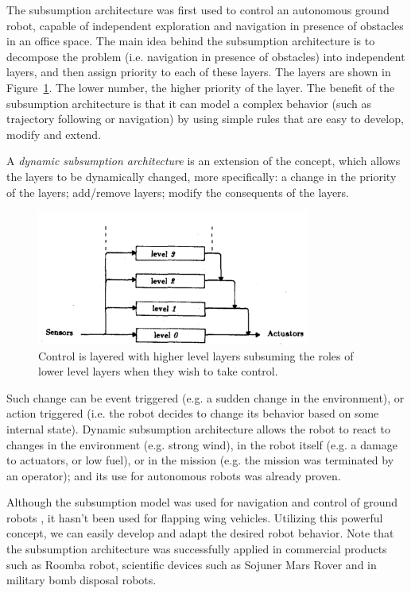 The subsumption architecture was first used to control an autonomous ground robot, capable of independent exploration and navigation in presence of obstacles in an office space. The main idea behind the subsumption architecture is to decompose the problem (i.e. navigation in presence of obstacles) into independent layers, and then assign priority to each of these layers. The layers are shown in Figure~\ref{fig_subsump}. The lower number, the higher priority of the layer. The benefit of the subsumption architecture is that it can model a complex behavior (such as trajectory following or navigation) by using simple rules that are easy to develop, modify and extend.

A \textit{dynamic subsumption architecture} is an extension of the concept, which allows the layers to be dynamically changed, more specifically: a change in the priority of the layers; add/remove layers; modify the consequents of the layers.

\begin{figure}
\centering
\includegraphics[width=0.8\textwidth]{Files/Figures/subsumption.png}
\caption[Subsumption architecture control layers]{Control is layered with higher level layers subsuming the roles of lower level layers when they wish to take control. \cite{brooks}}
\label{fig_subsump}
\end{figure}

Such change can be event triggered (e.g. a sudden change in the environment), or action triggered (i.e. the robot decides to change its behavior based on some internal state). Dynamic subsumption architecture allows the robot to react to changes in the environment (e.g. strong wind), in the robot itself (e.g. a damage to actuators, or low fuel), or in the mission (e.g. the mission was terminated by an operator); and its use for autonomous robots was already proven. 

Although the subsumption model was used for navigation and control of ground robots \cite{robot1, robot2}, it hasn't been used for flapping wing vehicles. Utilizing this powerful concept, we can easily develop and adapt the desired robot behavior. Note that the subsumption architecture was successfully applied in commercial products such as Roomba robot, scientific devices such as Sojuner Mars Rover and in military bomb disposal robots.


